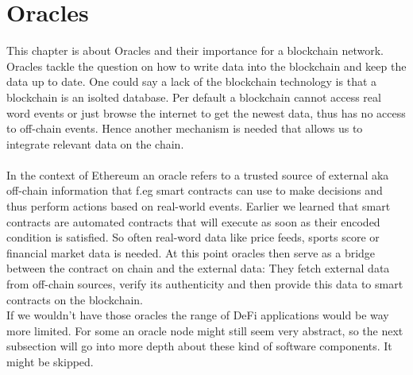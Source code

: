 \documentclass{article}
\begin{document}
\section{Oracles}
This chapter is about Oracles and their importance for a blockchain network. Oracles tackle the question on how to write data into the blockchain and keep the data up to date. One could say a lack of the blockchain technology is that a blockchain is an isolted database. Per default a blockchain cannot access real word events or just browse the internet to get the newest data, thus has no access to off-chain events. Hence another mechanism is needed that allows us to integrate relevant data on the chain.\\
\\
In the context of Ethereum an oracle refers to a trusted source of external aka off-chain  information that f.eg smart contracts can use to make decisions and thus perform actions based on real-world events. Earlier we learned that smart contracts are automated contracts that will execute as soon as their encoded condition is satisfied. So often real-word data like price feeds, sports score or financial market data is needed. At this point oracles then serve as a bridge between the contract on chain and the external data: They fetch external data from off-chain sources, verify its authenticity and then provide this data to smart contracts on the blockchain.\\
If we wouldn't have those oracles the range of DeFi applications would be way more limited. 
For some an oracle node might still seem very abstract, so the next subsection will go into more depth about these kind of software components. It might be skipped.
\end{document}
